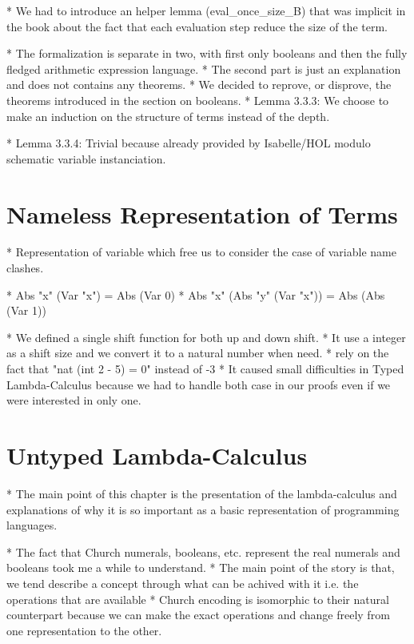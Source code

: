\documentclass[a4paper, oneside, 12pt, titlepage]{article}
\begin{document}
  * We had to introduce an helper lemma (eval\_once\_size\_B) that was implicit in the book about the
    fact that each evaluation step reduce the size of the term.

  * The formalization is separate in two, with first only booleans and then the fully fledged
    arithmetic expression language.
    * The second part is just an explanation and does not contains any theorems.
      * We decided to reprove, or disprove, the theorems introduced in the section on booleans.
  * Lemma 3.3.3: We choose to make an induction on the structure of terms instead of the depth.

  * Lemma 3.3.4: Trivial because already provided by Isabelle/HOL modulo schematic variable
    instanciation.

\section{Nameless Representation of Terms}
\label{sec:nameless-rep-of-terms}

  * Representation of variable which free us to consider the case of variable name clashes.

  * Abs "x" (Var "x") = Abs (Var 0)
  * Abs "x" (Abs "y" (Var "x")) = Abs (Abs (Var 1))

  * We defined a single shift function for both up and down shift.
    * It use a integer as a shift size and we convert it to a natural number when need.
      * rely on the fact that "nat (int 2 - 5) = 0" instead of -3
    * It caused small difficulties in Typed Lambda-Calculus because we had to handle both case in
      our proofs even if we were interested in only one.

\section{Untyped Lambda-Calculus}
\label{sec:untyped-lambda-calculus}

  * The main point of this chapter is the presentation of the lambda-calculus and explanations of
    why it is so important as a basic representation of programming languages.

  * The fact that Church numerals, booleans, etc. represent the real numerals and booleans took me a
    while to understand.
    * The main point of the story is that, we tend describe a concept through what can be achived
      with it i.e. the operations that are available
    * Church encoding is isomorphic to their natural counterpart because we can make the exact
      operations and change freely from one representation to the other.
\end{document}
